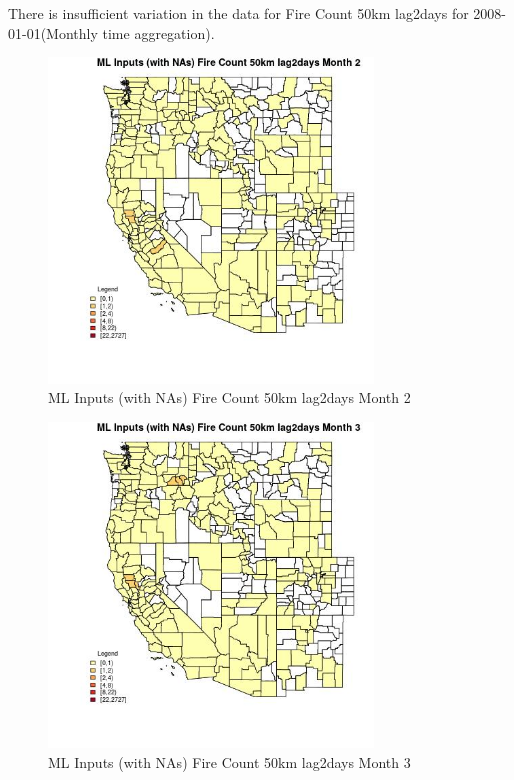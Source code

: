 There is insufficient variation in the data for Fire Count 50km lag2days for 2008-01-01(Monthly time aggregation). 
 

\begin{figure} 
\centering  
\includegraphics[width=0.77\textwidth]{Code_Outputs/Report_ML_input_PM25_Step4_part_f_de_duplicated_aveswNAs_CountyFire_Count_50km_lag2daysmedianMonth2.jpg} 
\caption{\label{fig:Report_ML_input_PM25_Step4_part_f_de_duplicated_aveswNAsCountyFire_Count_50km_lag2daysmedianMonth2}ML Inputs (with NAs) Fire Count 50km lag2days Month 2} 
\end{figure} 
 

\clearpage 

\begin{figure} 
\centering  
\includegraphics[width=0.77\textwidth]{Code_Outputs/Report_ML_input_PM25_Step4_part_f_de_duplicated_aveswNAs_CountyFire_Count_50km_lag2daysmedianMonth3.jpg} 
\caption{\label{fig:Report_ML_input_PM25_Step4_part_f_de_duplicated_aveswNAsCountyFire_Count_50km_lag2daysmedianMonth3}ML Inputs (with NAs) Fire Count 50km lag2days Month 3} 
\end{figure} 
 

